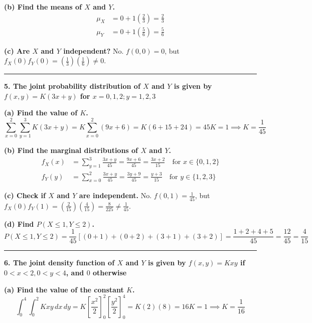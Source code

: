 \documentclass{article}
\begin{document}
\textbf{(b) Find the means of $X$ and $Y$.}
\begin{align*}
\mu_X &= 0 + 1\left(\frac{2}{3}\right) = \frac{2}{3} \\
\mu_Y &= 0 + 1\left(\frac{5}{6}\right) = \frac{5}{6}
\end{align*}

\textbf{(c) Are $X$ and $Y$ independent?}
No. $f(0,0) = 0$, but $f_X(0)f_Y(0) = \left(\frac{1}{3}\right)\left(\frac{1}{6}\right) \neq 0$.

\vspace{1em}
\hrule
\vspace{1em}

\textbf{5. The joint probability distribution of $X$ and $Y$ is given by $f(x,y) = K(3x+y)$ for $x = 0,1,2; y = 1,2,3$}

\textbf{(a) Find the value of $K$.}
$$\sum_{x=0}^{2} \sum_{y=1}^{3} K(3x+y) = K \sum_{x=0}^{2} (9x+6) = K(6 + 15 + 24) = 45K = 1 \implies K = \frac{1}{45}$$

\textbf{(b) Find the marginal distributions of $X$ and $Y$.}
\begin{align*}
f_X(x) &= \sum_{y=1}^{3} \frac{3x+y}{45} = \frac{9x+6}{45} = \frac{3x+2}{15} \quad \text{for } x \in \{0,1,2\} \\
f_Y(y) &= \sum_{x=0}^{2} \frac{3x+y}{45} = \frac{3y+9}{45} = \frac{y+3}{15} \quad \text{for } y \in \{1,2,3\}
\end{align*}

\textbf{(c) Check if $X$ and $Y$ are independent.}
No. $f(0,1) = \frac{1}{45}$, but $f_X(0)f_Y(1) = \left(\frac{2}{15}\right)\left(\frac{4}{15}\right) = \frac{8}{225} \neq \frac{1}{45}$.

\textbf{(d) Find $P(X \le 1,Y \le 2)$.}
$$P(X \le 1, Y \le 2) = \frac{1}{45} [ (0+1) + (0+2) + (3+1) + (3+2) ] = \frac{1+2+4+5}{45} = \frac{12}{45} = \frac{4}{15}$$

\vspace{1em}
\hrule
\vspace{1em}

\textbf{6. The joint density function of $X$ and $Y$ is given by $f(x,y) = Kxy$ if $0 < x < 2, 0 < y < 4$, and $0$ otherwise}

\textbf{(a) Find the value of the constant $K$.}
$$\int_{0}^{4} \int_{0}^{2} Kxy \,dx \,dy = K \left[ \frac{x^2}{2} \right]_0^2 \left[ \frac{y^2}{2} \right]_0^4 = K (2) (8) = 16K = 1 \implies K = \frac{1}{16}$$
\end{document}
